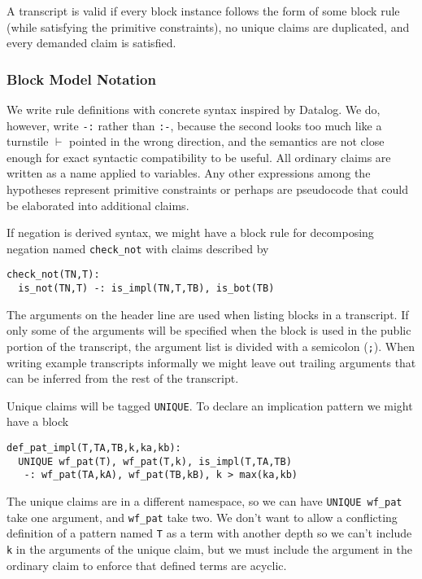 \documentclass{article}
\theoremstyle{plain}
\theoremstyle{definition}
\begin{document}
A transcript is valid if every block instance follows the form of
some block rule (while satisfying the primitive constraints),
no unique claims are duplicated, and every demanded claim is
satisfied.

\subsubsection{Block Model Notation}\label{block-model-notation}

We write rule definitions with concrete syntax inspired by Datalog.
We do, however, write \verb|-:| rather than \verb|:-|, because the
second looks too much like a turnstile $\vdash$ pointed in the
wrong direction, and the semantics are not close enough for
exact syntactic compatibility to be useful.
All ordinary claims are written as a name applied to variables.
Any other expressions among the hypotheses represent primitive
constraints or perhaps are pseudocode that could be elaborated
into additional claims.

If negation is derived syntax, we might have a block rule for decomposing
negation named \texttt{check\_not} with claims described by

\begin{verbatim}
check_not(TN,T):
  is_not(TN,T) -: is_impl(TN,T,TB), is_bot(TB)
\end{verbatim}

The arguments on the header line are used when listing blocks in
a transcript.
If only some of the arguments will be specified when the block is
used in the public portion of the transcript, the argument list
is divided with a semicolon (\texttt{;}).
When writing example transcripts informally we might leave out
trailing arguments that can be inferred from the rest of the transcript.

Unique claims will be tagged \texttt{UNIQUE}. To declare an implication
pattern we might have a block

\begin{verbatim}
def_pat_impl(T,TA,TB,k,ka,kb):
  UNIQUE wf_pat(T), wf_pat(T,k), is_impl(T,TA,TB)
   -: wf_pat(TA,kA), wf_pat(TB,kB), k > max(ka,kb)
\end{verbatim}

The unique claims are in a different namespace, so we can have
\texttt{UNIQUE wf\_pat} take one argument, and \texttt{wf\_pat} take two.
We don't want to allow a conflicting definition of a pattern named
\texttt{T} as a term with another depth so we can't include
\texttt{k} in the arguments of the unique claim, but we must
include the argument in the ordinary claim
to enforce that defined terms are acyclic.
\end{document}

